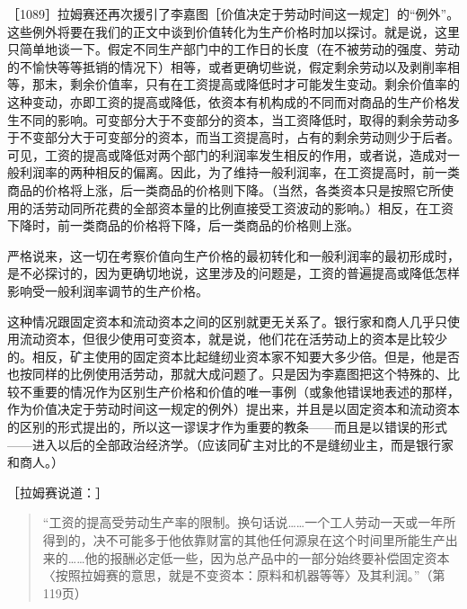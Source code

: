［1089］拉姆赛还再次援引了李嘉图［价值决定于劳动时间这一规定］的“例外”。这些例外将要在我们的正文中谈到价值转化为生产价格时加以探讨。就是说，这里只简单地谈一下。假定不同生产部门中的工作日的长度（在不被劳动的强度、劳动的不愉快等等抵销的情况下）相等，或者更确切些说，假定剩余劳动以及剥削率相等，那末，剩余价值率，只有在工资提高或降低时才可能发生变动。剩余价值率的这种变动，亦即工资的提高或降低，依资本有机构成的不同而对商品的生产价格发生不同的影响。可变部分大于不变部分的资本，当工资降低时，取得的剩余劳动多于不变部分大于可变部分的资本，而当工资提高时，占有的剩余劳动则少于后者。可见，工资的提高或降低对两个部门的利润率发生相反的作用，或者说，造成对一般利润率的两种相反的偏离。因此，为了维持一般利润率，在工资提高时，前一类商品的价格将上涨，后一类商品的价格则下降。（当然，各类资本只是按照它所使用的活劳动同所花费的全部资本量的比例直接受工资波动的影响。）相反，在工资下降时，前一类商品的价格将下降，后一类商品的价格则上涨。

严格说来，这一切在考察价值向生产价格的最初转化和一般利润率的最初形成时，是不必探讨的，因为更确切地说，这里涉及的问题是，工资的普遍提高或降低怎样影响受一般利润率调节的生产价格。

这种情况跟固定资本和流动资本之间的区别就更无关系了。银行家和商人几乎只使用流动资本，但很少使用可变资本，就是说，他们花在活劳动上的资本是比较少的。相反，矿主使用的固定资本比起缝纫业资本家不知要大多少倍。但是，他是否也按同样的比例使用活劳动，那就大成问题了。只是因为李嘉图把这个特殊的、比较不重要的情况作为区别生产价格和价值的唯一事例（或象他错误地表述的那样，作为价值决定于劳动时间这一规定的例外）提出来，并且是以固定资本和流动资本的区别的形式提出的，所以这一谬误才作为重要的教条——而且是以错误的形式——进入以后的全部政治经济学。（应该同矿主对比的不是缝纫业主，而是银行家和商人。）

［拉姆赛说道：］

\begin{quote}{“工资的提高受劳动生产率的限制。换句话说……一个工人劳动一天或一年所得到的，决不可能多于他依靠财富的其他任何源泉在这个时间里所能生产出来的……他的报酬必定低一些，因为总产品中的一部分始终要补偿固定资本〈按照拉姆赛的意思，就是不变资本：原料和机器等等〉及其利润。”（第119页）}\end{quote}

